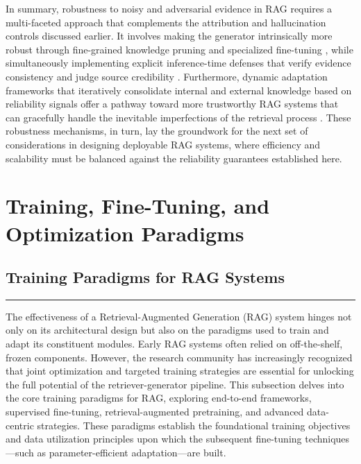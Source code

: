 \documentclass[11pt]{article}
\begin{document}
In summary, robustness to noisy and adversarial evidence in RAG requires a multi-faceted approach that complements the attribution and hallucination controls discussed earlier. It involves making the generator intrinsically more robust through fine-grained knowledge pruning and specialized fine-tuning \cite{ref185,ref210,ref211}, while simultaneously implementing explicit inference-time defenses that verify evidence consistency and judge source credibility \cite{ref212,ref211}. Furthermore, dynamic adaptation frameworks that iteratively consolidate internal and external knowledge based on reliability signals offer a pathway toward more trustworthy RAG systems that can gracefully handle the inevitable imperfections of the retrieval process \cite{ref215,ref216}. These robustness mechanisms, in turn, lay the groundwork for the next set of considerations in designing deployable RAG systems, where efficiency and scalability must be balanced against the reliability guarantees established here.

\section{Training, Fine-Tuning, and Optimization Paradigms}

\subsection{Training Paradigms for RAG Systems}

\begin{center}\rule{0.5\linewidth}{0.5pt}\end{center}

The effectiveness of a Retrieval-Augmented Generation (RAG) system hinges not only on its architectural design but also on the paradigms used to train and adapt its constituent modules. Early RAG systems often relied on off-the-shelf, frozen components. However, the research community has increasingly recognized that joint optimization and targeted training strategies are essential for unlocking the full potential of the retriever-generator pipeline. This subsection delves into the core training paradigms for RAG, exploring end-to-end frameworks, supervised fine-tuning, retrieval-augmented pretraining, and advanced data-centric strategies. These paradigms establish the foundational training objectives and data utilization principles upon which the subsequent fine-tuning techniques---such as parameter-efficient adaptation---are built.
\end{document}
